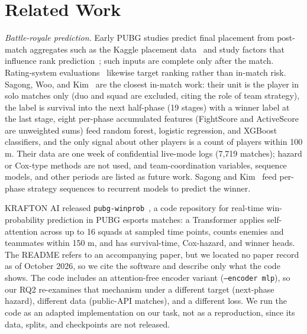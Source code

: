 \section{Related Work}\label{sec:related}

\emph{Battle-royale prediction.} Early PUBG studies predict final placement from post-match aggregates such as the Kaggle placement data~\cite{kagglePubgFinishPlacement,rokad2019pubgPlacement,sen2021pubgFinalRank} and study factors that influence rank prediction~\cite{lee2025pubgRankFactors}; such inputs are complete only after the match. Rating-system evaluations~\cite{dehpanah2020freeForAllRating,dehpanah2021teamBattleRoyaleRating} likewise target ranking rather than in-match risk. Sagong, Woo, and Kim~\cite{sagong2025hunterCamper} are the closest in-match work: their unit is the player in solo matches only (duo and squad are excluded, citing the role of team strategy), the label is survival into the next half-phase (19 stages) with a winner label at the last stage, eight per-phase accumulated features (FightScore and ActiveScore are unweighted sums) feed random forest, logistic regression, and XGBoost classifiers, and the only signal about other players is a count of players within 100 m. Their data are one week of confidential live-mode logs (7,719 matches); hazard or Cox-type methods are not used, and team-coordination variables, sequence models, and other periods are listed as future work. Sagong and Kim~\cite{sagong2025survivalSequences} feed per-phase strategy sequences to recurrent models to predict the winner.

KRAFTON AI released \texttt{pubg-winprob}~\cite{krafton_pubg_winprob}, a code repository for real-time win-probability prediction in PUBG esports matches: a Transformer applies self-attention across up to 16 squads at sampled time points, counts enemies and teammates within 150 m, and has survival-time, Cox-hazard, and winner heads. The README refers to an accompanying paper, but we located no paper record as of October 2026, so we cite the software and describe only what the code shows. The code includes an attention-free encoder variant (\texttt{--encoder mlp}), so our RQ2 re-examines that mechanism under a different target (next-phase hazard), different data (public-API matches), and a different loss. We run the code as an adapted implementation on our task, not as a reproduction, since its data, splits, and checkpoints are not released.

